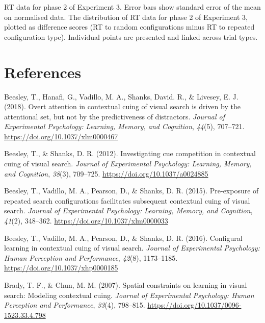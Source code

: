 \documentclass[
  man,floatsintext]{apa7}
\newlength{\cslhangindent}
\newlength{\cslentryspacingunit} %
\newenvironment{CSLReferences}[2] %
 {%
  \setlength{\parindent}{0pt}
  \ifodd #1
  \let\oldpar\par
  \def\par{\hangindent=\cslhangindent\oldpar}
  \fi
  \setlength{\parskip}{#2\cslentryspacingunit}
 }%
 {}
\begin{document}
RT data for phase 2 of Experiment 3. Error bars show standard error of the mean on normalised data. The distribution of RT data for phase 2 of Experiment 3, plotted as difference scores (RT to random configurations minus RT to repeated configuration type). Individual points are presented and linked across trial types.

\newpage

\hypertarget{references}{%
\section*{References}\label{references}}

\hypertarget{refs}{}
\begin{CSLReferences}{1}{0}
\leavevmode{}%
Beesley, T., Hanafi, G., Vadillo, M. A., Shanks, David. R., \& Livesey, E. J. (2018). Overt attention in contextual cuing of visual search is driven by the attentional set, but not by the predictiveness of distractors. \emph{Journal of Experimental Psychology: Learning, Memory, and Cognition}, \emph{44}(5), 707--721. \url{https://doi.org/10.1037/xlm0000467}

\leavevmode{}%
Beesley, T., \& Shanks, D. R. (2012). Investigating cue competition in contextual cuing of visual search. \emph{Journal of Experimental Psychology: Learning, Memory, and Cognition}, \emph{38}(3), 709--725. \url{https://doi.org/10.1037/a0024885}

\leavevmode{}%
Beesley, T., Vadillo, M. A., Pearson, D., \& Shanks, D. R. (2015). Pre-exposure of repeated search configurations facilitates subsequent contextual cuing of visual search. \emph{Journal of Experimental Psychology: Learning, Memory, and Cognition}, \emph{41}(2), 348--362. \url{https://doi.org/10.1037/xlm0000033}

\leavevmode{}%
Beesley, T., Vadillo, M. A., Pearson, D., \& Shanks, D. R. (2016). Configural learning in contextual cuing of visual search. \emph{Journal of Experimental Psychology: Human Perception and Performance}, \emph{42}(8), 1173--1185. \url{https://doi.org/10.1037/xhp0000185}

\leavevmode{}%
Brady, T. F., \& Chun, M. M. (2007). Spatial constraints on learning in visual search: {Modeling} contextual cuing. \emph{Journal of Experimental Psychology: Human Perception and Performance}, \emph{33}(4), 798--815. \url{https://doi.org/10.1037/0096-1523.33.4.798}


\end{CSLReferences}
\end{document}
